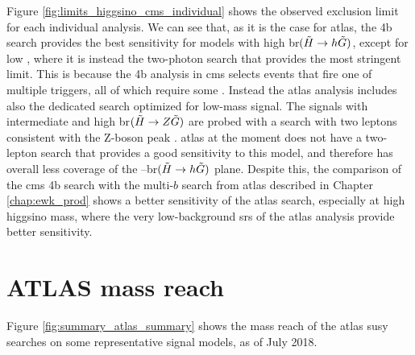 Figure \ref{fig:limits_higgsino_cms_individual} shows the observed exclusion limit for each individual analysis. 
We can see that, as it is the case for \gls{atlas}, the 4b search \cite{Sirunyan:2017obz} provides the 
best sensitivity for models with high \gls{br}$(\tilde{H}\rightarrow h \tilde{G})$, except for low \mhino, where 
it is instead the two-photon search \cite{Sirunyan:2017eie} that provides the most stringent limit.
This is because the 4b analysis in \gls{cms} selects events that fire one of multiple triggers, 
all of which require some \met. 
Instead the \gls{atlas} analysis 
includes also the dedicated search optimized for low-mass signal.
The signals with intermediate and high \gls{br}$(\tilde{H}\rightarrow Z \tilde{G})$ are probed with a 
search with two leptons consistent with the Z-boson peak \cite{Sirunyan:2017qaj}. 
\gls{atlas} at the moment does not have a two-lepton search that provides a good sensitivity to this model,
and therefore has overall less coverage of the \mhino--\gls{br}$(\tilde{H}\rightarrow h \tilde{G})$ plane.
Despite this, the comparison of the \gls{cms} 4b search with the multi-$b$ search from \gls{atlas}
described in Chapter \ref{chap:ewk_prod} shows a better sensitivity of the \gls{atlas} search, 
especially at high higgsino mass,
where the very low-background \glspl{sr} of the \gls{atlas} analysis provide better sensitivity. 




\FloatBarrier


\section{ATLAS mass reach}

Figure \ref{fig:summary_atlas_summary} shows the mass reach of the \gls{atlas} \gls{susy} searches on 
some representative signal models, as of July 2018. 

